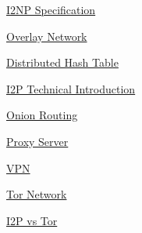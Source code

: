     \vspace{2em}
\begin{thebibliography}{9}


   \href{https://geti2p.net/spec/i2np}{I2NP Specification}
   
   \href{https://en.wikipedia.org/wiki/Overlay_network}{Overlay Network}
   
   \href{https://en.wikipedia.org/wiki/Distributed_hash_table}{Distributed Hash Table}
   
    \href{https://geti2p.net/en/docs/how/tech-intro}{I2P Technical Introduction}
    
    \href{https://en.wikipedia.org/wiki/Onion_routing}{Onion Routing}
 

    \href{https://en.wikipedia.org/wiki/Proxy_server}{Proxy Server}
    
    \href{https://en.wikipedia.org/wiki/Virtual_private_network}{VPN}
    
    
    \href{https://en.wikipedia.org/wiki/Tor_%28anonymity_network%29}{Tor Network}
    
    \href{https://geti2p.net/en/comparison/tor}{I2P vs Tor}
    
    
\end{thebibliography}

